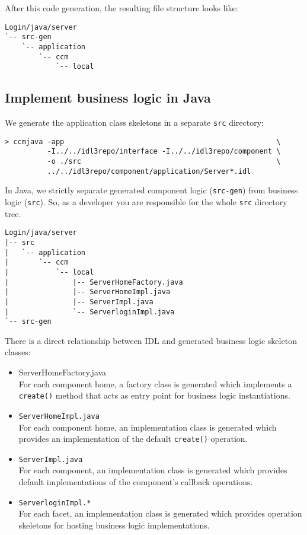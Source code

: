 After this code generation, the resulting file structure looks like:
\begin{verbatim}
Login/java/server
`-- src-gen
    `-- application
        `-- ccm
            `-- local
\end{verbatim}


\subsection{Implement business logic in Java}
\label{subsection:ImplementBusinessLogicInJava}

We generate the application class skeletons in a separate {\tt src} directory: 
\begin{verbatim}
> ccmjava -app                                                  \
          -I../../idl3repo/interface -I../../idl3repo/component \
          -o ./src                                              \
          ../../idl3repo/component/application/Server*.idl      
\end{verbatim}

In Java, we strictly separate generated component logic ({\tt src-gen})
from business logic ({\tt src}). 
So, as a developer you are responsible for the whole {\tt src} directory tree.

\begin{verbatim}
Login/java/server
|-- src
|   `-- application
|       `-- ccm
|           `-- local
|               |-- ServerHomeFactory.java
|               |-- ServerHomeImpl.java
|               |-- ServerImpl.java
|               `-- ServerloginImpl.java
`-- src-gen
\end{verbatim}


\vspace{3mm}
There is a direct relationship between IDL and generated business logic skeleton
classes:

\begin{itemize}
	\item {ServerHomeFactory.java} \\
	For each component home, a factory class is generated which implements a {\tt create()}
	method that acts as entry point for business logic instantiations.
		  
	\item {\tt ServerHomeImpl.java}\\
	For each component home, an implementation class is generated which provides an
	implementation of the default {\tt create()} operation.

\item {\tt ServerImpl.java}\\
	For each component, an implementation class is generated which provides 
	default implementations of the component's callback operations.
	
\item {\tt ServerloginImpl.*}\\
	For each facet, an implementation class is generated which provides operation
	skeletons for hosting business logic implementations.
\end{itemize}

